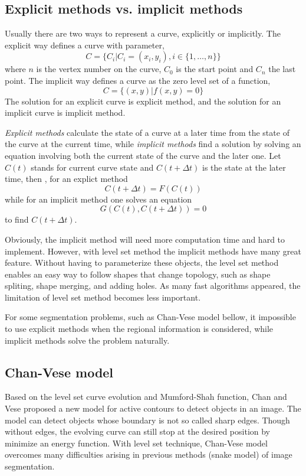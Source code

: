 \subsection{Explicit methods vs. implicit methods}
Usually there are two ways to represent a curve, explicitly or implicitly. The explicit way defines a curve with parameter, 
\begin{equation}
C = \{C_i| C_i=(x_i, y_i), i \in \{1,\ldots,n\}\}
\end{equation}
where $n$ is the vertex number on the curve, $C_0$ is the start point and $C_n$ the last point. The implicit way defines a curve as the zero level set of a function,
\begin{equation}
C = \{(x,y)|f(x,y) = 0\}
\end{equation}
The solution for an explicit curve is explicit method, and the solution for an implicit curve is implicit method. 

\emph{Explicit methods} calculate the state of a curve at a later time from the state of the curve at the current time, while \emph{implicit methods} find a solution by solving an equation involving both the current state of the curve and the later one. Let $C(t)$ stands for current curve state and $C(t+\Delta t)$ is the state at the later time, then , for an explict method
\begin{equation}
C(t+\Delta t) = F(C(t))
\end{equation}
while for an implicit method one solves an equation
\begin{equation}
G(C(t), C(t+\Delta t)) = 0
\end{equation}
to find $C(t + \Delta t)$.

Obviously, the implicit method will need more computation time and hard to implement. However, with level set method the implicit methods have many great feature. Without having to parameterize these objects, the level set method enables an easy way to follow shapes that change topology, such as shape spliting, shape merging, and adding holes. As many fast algorithms appeared, the limitation of level set method becomes less important. 

For some segmentation problems, such as Chan-Vese model bellow, it impossible to use explicit methods when the regional information is considered, while implicit methods solve the problem naturally.
\subsection{Chan-Vese model}
Based on the level set curve evolution and Mumford-Shah function, Chan and Vese \cite{chan2001active} proposed a new model for active contours to detect objects in an image. The model can detect objects whose boundary is not so called sharp edges. Though without edges, the evolving curve can still stop at the desired position by minimize an energy function. With level set technique, Chan-Vese model overcomes many difficulties arising in previous methods (snake model) of image segmentation.

